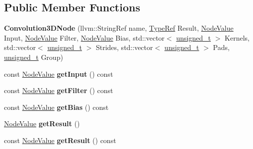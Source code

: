 \subsection*{Public Member Functions}
\begin{DoxyCompactItemize}
\item 
\mbox{\label{classglow_1_1_convolution3_d_node_a915aa5861ee863c3c85afc17100e96b5}} 
{\bfseries Convolution3\+D\+Node} (llvm\+::\+String\+Ref name, \hyperlink{structglow_1_1_type}{Type\+Ref} Result, \hyperlink{structglow_1_1_node_value}{Node\+Value} Input, \hyperlink{structglow_1_1_node_value}{Node\+Value} Filter, \hyperlink{structglow_1_1_node_value}{Node\+Value} Bias, std\+::vector$<$ \hyperlink{namespaceglow_a0ca574644e1e42ef193a9947fb4d8911}{unsigned\+\_\+t} $>$ Kernels, std\+::vector$<$ \hyperlink{namespaceglow_a0ca574644e1e42ef193a9947fb4d8911}{unsigned\+\_\+t} $>$ Strides, std\+::vector$<$ \hyperlink{namespaceglow_a0ca574644e1e42ef193a9947fb4d8911}{unsigned\+\_\+t} $>$ Pads, \hyperlink{namespaceglow_a0ca574644e1e42ef193a9947fb4d8911}{unsigned\+\_\+t} Group)
\item 
\mbox{\label{classglow_1_1_convolution3_d_node_a6c3edb8f448b878927e0fbcc2abd6c6c}} 
const \hyperlink{structglow_1_1_node_value}{Node\+Value} {\bfseries get\+Input} () const
\item 
\mbox{\label{classglow_1_1_convolution3_d_node_ac83ba046a88886f3acf09691f1df2d6e}} 
const \hyperlink{structglow_1_1_node_value}{Node\+Value} {\bfseries get\+Filter} () const
\item 
\mbox{\label{classglow_1_1_convolution3_d_node_aed429a4d647af79a1ec1b6d440d493e7}} 
const \hyperlink{structglow_1_1_node_value}{Node\+Value} {\bfseries get\+Bias} () const
\item 
\mbox{\label{classglow_1_1_convolution3_d_node_ab0cd86b85c16d83aa645a74d4a563e19}} 
\hyperlink{structglow_1_1_node_value}{Node\+Value} {\bfseries get\+Result} ()
\item 
\mbox{\label{classglow_1_1_convolution3_d_node_aae980bce6dbdff63d1e1c9c0ba667f6d}} 
const \hyperlink{structglow_1_1_node_value}{Node\+Value} {\bfseries get\+Result} () const

\end{DoxyCompactItemize}
